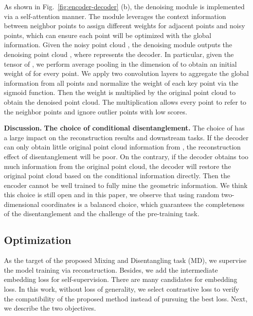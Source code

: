\documentclass[journal]{IEEEtran}
\begin{document}
As shown in Fig.~\ref{fig:encoder-decoder} (b), the denoising module is implemented via a self-attention manner. 
The module leverages the context information between neighbor points to assign different weights for adjacent points and noisy points, which can ensure each point will be optimized with the global information. 
Given the noisy point cloud , the denoising module outputs  the denoising point cloud ,
where  represents the decoder.
In particular, given the tensor  of , we perform average pooling in the dimension of  to obtain an initial weight of  for every point. 
We apply two convolution layers to aggregate the global information from all points and normalize the weight of each key point via the sigmoid function. Then the weight is multiplied by the original point cloud to obtain the denoised point cloud. The multiplication allows every point to refer to the neighbor points and ignore outlier points with low scores. 

\textbf{Discussion.} \textbf{The choice of conditional disentanglement.} The choice of  has a large impact on the reconstruction results and downstream tasks. If the decoder can only obtain little original point cloud information from , the reconstruction effect of disentanglement will be poor. On the contrary, if the decoder obtains too much information from the original point cloud, the decoder will restore the original point cloud based on the conditional information directly. Then the encoder cannot be well trained to fully mine the geometric information. We think this choice is still open and in this paper, we observe that using random two-dimensional coordinates is a balanced choice, which guarantees the completeness of the disentanglement and the challenge of the pre-training task. 


\subsection{Optimization}
As the target of the proposed Mixing and Disentangling task (MD), we supervise the model training via reconstruction.
Besides, we add the intermediate embedding loss for self-supervision. There are many candidates for embedding loss. In this work, without loss of generality, we select contrastive loss to verify the compatibility of the proposed method instead of pursuing the best loss. Next, we describe the two objectives. 
\end{document}
